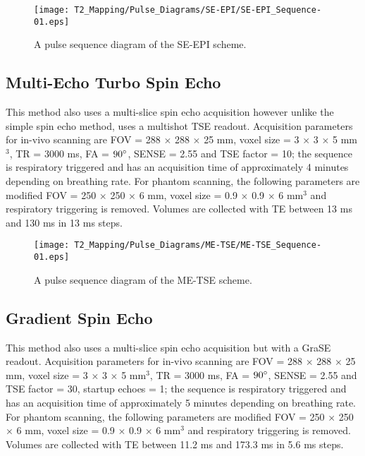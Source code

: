\begin{figure}[H]
	\centering
	\texttt{[image: T2\_Mapping/Pulse\_Diagrams/SE-EPI/SE-EPI\_Sequence-01.eps]}
	\caption{A pulse sequence diagram of the \ac{SE}-\ac{EPI} scheme.}
	\label{fig:t2_se-epi_seq}	
\end{figure}

\subsection{Multi-Echo Turbo Spin Echo}

This method also uses a multi-slice spin echo acquisition however unlike the simple spin echo method, uses a multishot \ac{TSE} readout. Acquisition parameters for in-vivo scanning are \ac{FOV} = 288 $\times$ 288 $\times$ 25 mm, voxel size = 3 $\times$ 3 $\times$ 5 mm$^3$, \ac{TR} = 3000 ms, \ac{FA} = $90\degree$, \ac{SENSE} = 2.55 and \ac{TSE} factor = 10; the sequence is respiratory triggered and has an acquisition time of approximately 4 minutes depending on breathing rate. For phantom scanning, the following parameters are modified \ac{FOV} = 250 $\times$ 250 $\times$ 6 mm, voxel size = 0.9 $\times$ 0.9 $\times$ 6 mm$^3$ and respiratory triggering is removed. Volumes are collected with \ac{TE} between 13 ms and 130 ms in 13 ms steps.

\begin{figure}[H]
	\centering
	\texttt{[image: T2\_Mapping/Pulse\_Diagrams/ME-TSE/ME-TSE\_Sequence-01.eps]}
	\caption{A pulse sequence diagram of the \ac{ME-TSE} scheme.}
	\label{fig:t2_me-tse_seq}	
\end{figure}

\subsection{Gradient Spin Echo}

This method also uses a multi-slice spin echo acquisition but with a \ac{GraSE} readout. Acquisition parameters for in-vivo scanning are \ac{FOV} = 288 $\times$ 288 $\times$ 25 mm, voxel size = 3 $\times$ 3 $\times$ 5 mm$^3$, \ac{TR} = 3000 ms, \ac{FA} = $90\degree$, \ac{SENSE} = 2.55 and \ac{TSE} factor = 30, startup echoes = 1; the sequence is respiratory triggered and has an acquisition time of approximately 5 minutes depending on breathing rate. For phantom scanning, the following parameters are modified \ac{FOV} = 250 $\times$ 250 $\times$ 6 mm, voxel size = 0.9 $\times$ 0.9 $\times$ 6 mm$^3$ and respiratory triggering is removed. Volumes are collected with \ac{TE} between 11.2 ms and 173.3 ms in 5.6 ms steps.

